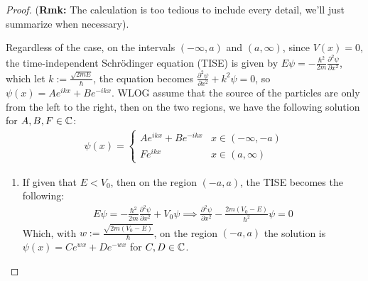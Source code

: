 \documentclass{article}
\begin{document}
\begin{proof}
    (\textbf{Rmk:} The calculation is too tedious to include every detail, we'll just summarize when necessary).

    \hfil

    Regardless of the case, on the intervals $(-\infty,a)$ and $(a,\infty)$, since $V(x)=0$, the time-independent Schr\"odinger equation (TISE) is given by $E\psi=-\frac{\hbar^2}{2m}\frac{\partial^2\psi}{\partial x^2}$, which let $k:=\frac{\sqrt{2mE}}{\hbar}$, the equation becomes $\frac{\partial^2\psi}{\partial x^2}+k^2\psi=0$, so $\psi(x)=Ae^{ikx}+Be^{-ikx}$. WLOG assume that the source of the particles are only from the left to the right, then on the two regions, we have the following solution for $A,B,F\in\mathbb{C}$:
    \begin{align}
        \psi(x)=\begin{cases}
            Ae^{ikx}+Be^{-ikx} &x\in(-\infty,-a)\\
            Fe^{ikx} &x\in(a,\infty)
        \end{cases}
    \end{align}
    \begin{enumerate}
        \item If given that $E<V_0$, then on the region $(-a,a)$, the TISE becomes the following:
        \begin{align}
            E\psi=-\frac{\hbar^2}{2m}\frac{\partial^2\psi}{\partial x^2}+V_0\psi \implies \frac{\partial^2\psi}{\partial x^2}-\frac{2m(V_0-E)}{\hbar^2}\psi=0
        \end{align}
        Which, with $w :=\frac{\sqrt{2m(V_0-E)}}{\hbar}$, on the region $(-a,a)$ the solution is $\psi(x)=Ce^{wx}+De^{-wx}$ for $C,D\in\mathbb{C}$.


\end{enumerate}
\end{proof}
\end{document}
